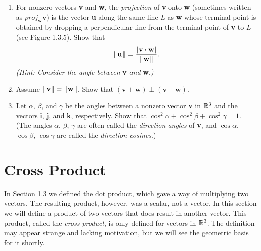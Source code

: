\begin{enumerate}[\bfseries 1.]
 \piccaption[]{}
 \item \label{ex:projection} For nonzero vectors \textbf{v} and \textbf{w}, the \emph{projection} of \textbf{v} onto
  \textbf{w} (sometimes written as $proj_{\textbf{w}}\textbf{v}$) is the vector \textbf{u} along the same line $L$ as
  \textbf{w} whose terminal point is obtained by dropping a perpendicular line from the terminal point of \textbf{v}
  to $L$ (see Figure 1.3.5). Show that
  \begin{displaymath}
   \lVert\mspace{1mu}\textbf{u}\mspace{1mu}\rVert = \frac{\lvert\mspace{1mu}\textbf{v} \bm{\cdot} \textbf{w}\mspace{1mu}\rvert}{\lVert\mspace{1mu}\textbf{w}\mspace{1mu}\rVert}.
  \end{displaymath}
  \emph{(Hint: Consider the angle between} \textbf{v} \emph{and} \textbf{w}.\emph{)}
  \item Assume $\lVert\mspace{1mu}\textbf{v}\mspace{1mu}\rVert=\lVert\mspace{1mu}\textbf{w}\mspace{1mu}\rVert$. 
  Show that 
  $(\textbf{v}+\textbf{w})\perp(\textbf{v}-\textbf{w})$.
  \item Let $\alpha$, $\beta$, and $\gamma$ be the angles between a nonzero vector \textbf{v} in $\mathbb{R}^{3}$ and the
  vectors \textbf{i}, \textbf{j}, and \textbf{k}, respectively. 
  Show that $\cos^2 \alpha + \cos^2 \beta +
  \cos^2 \gamma = 1$.
  (The angles $\alpha$, $\beta$, $\gamma$ are often called the \emph{direction angles} of \textbf{v},
  and $\cos \alpha$, $\cos \beta$, $\cos \gamma$ are called the \emph{direction cosines}.)
\end{enumerate}


\newpage
\section{Cross Product}
In Section 1.3 we defined the dot product, which gave a way of multiplying two vectors. The resulting product,
however, was a scalar, not a vector. In this section we will define a product of two vectors that does result in
another vector. This product, called the \emph{cross product}, is only defined for vectors
in $\mathbb{R}^{3}$. The definition may appear strange and lacking motivation, but we will see the geometric basis for
it shortly.


